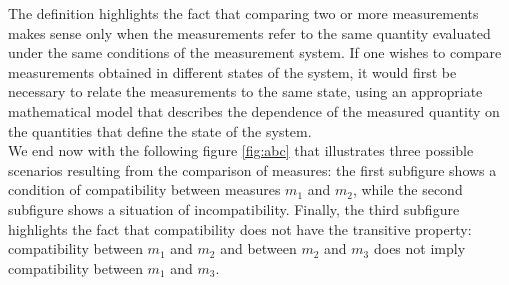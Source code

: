 \documentclass[../main.tex]{subfiles}
\begin{document}
The definition highlights the fact that comparing two or more measurements makes sense only when the measurements refer to the same quantity evaluated under the same conditions of the measurement system.  If one wishes to compare measurements obtained in different states of the system, it would first be necessary to relate the measurements to the same state, using an appropriate mathematical model that describes the dependence of the measured quantity on the quantities that define the state of the system.\\

We end now with the following figure \ref{fig:abc} that illustrates three possible scenarios resulting from the comparison of measures: the first subfigure shows a condition of compatibility between measures $m_1$ and $m_2$, while the second subfigure shows a situation of incompatibility.  Finally, the third subfigure highlights the fact that compatibility does not have the transitive property: compatibility between $m_1$ and $m_2$ and between $m_2$ and $m_3$ does not imply compatibility between $m_1$ and $m_3$.\\
\end{document}
